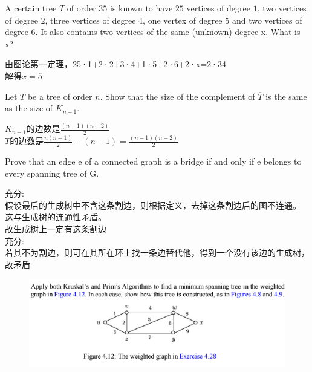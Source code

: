 \documentclass[a4paper, justified]{tufte-handout}
\begin{document}
\begin{problem}[CZ 4.14]
A certain tree $T$ of order $35$ is known to have $25$ vertices of degree $1$, two vertices of degree $2$, three vertices of degree $4$, one vertex of degree $5$ and two vertices of degree $6$. It also contains two vertices of the same (unknown) degree x. What is x?
\end{problem}

\begin{solution}
  由图论第一定理，25·1+2·2+3·4+1·5+2·6+2·x=2·34\\
  解得$x=5$
\end{solution}

\begin{problem}[CZ 4.22]
Let $T$ be a tree of order $n$. Show that the size of the complement of $\overline{T}$ is the same as the size of $K_{n − 1}$.
\end{problem}

\begin{solution}
  $K_{n-1}$的边数是$\frac{(n-1)(n-2)}{2}$\\
  $\overline{T}$的边数是$\frac{n(n-1)}{2}-(n-1)=\frac{(n-1)(n-2)}{2}$
\end{solution}

\begin{problem}[CZ 4.26]
Prove that an edge e of a connected graph is a bridge if and only if e belongs to every spanning tree of G.
\end{problem}

\begin{solution}
  充分:\\
  假设最后的生成树中不含这条割边，则根据定义，去掉这条割边后的图不连通。\\
  这与生成树的连通性矛盾。\\
  故生成树上一定有这条割边\\
  充分:\\
  若其不为割边，则可在其所在环上找一条边替代他，得到一个没有该边的生成树，故矛盾
\end{solution}

\begin{problem}[CZ 4.28]
\begin{figure}[htbp]
  \centering
  \includegraphics[width = 0.90\linewidth]{figs/b}
\end{figure}
\end{problem}
\end{document}
